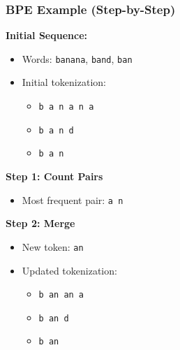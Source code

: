 \documentclass[usenames,dvipsnames,notes,11pt,aspectratio=169,hyperref={colorlinks=true, linkcolor=blue}]{beamer}
\begin{document}
\begin{frame}
\frametitle{BPE Example (Step-by-Step)}

\textbf{Initial Sequence:}\\
\begin{itemize}
    \item Words: \texttt{banana}, \texttt{band}, \texttt{ban}
    \item Initial tokenization:
    \begin{itemize}
        \item \texttt{b a n a n a}
        \item \texttt{b a n d}
        \item \texttt{b a n}
    \end{itemize}
\end{itemize}

\pause
\textbf{Step 1: Count Pairs}\\
\begin{itemize}
    \item Most frequent pair: \texttt{a n}
\end{itemize}

\pause
\textbf{Step 2: Merge}\\
\begin{itemize}
    \item New token: \texttt{an}
    \item Updated tokenization:
    \begin{itemize}
        \item \texttt{b an an a}
        \item \texttt{b an d}
        \item \texttt{b an}
    \end{itemize}
\end{itemize}
\end{frame}
\end{document}
